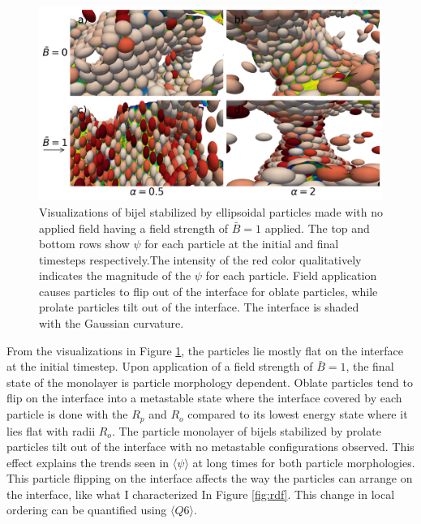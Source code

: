 \begin{figure} 
    \centering 
    \includegraphics[scale=0.4]{../figures/results/paper2/psi_concat_startB-0_endB-1.png} 
    \caption{Visualizations of bijel stabilized by ellipsoidal particles made with no applied field having a field strength of $\bar{B} = 1$ applied. The top and bottom 
             rows show $\psi$ for each particle at the initial and final timesteps respectively.The intensity
             of the red color qualitatively indicates the magnitude of the $\psi$ for each particle. Field application causes particles to flip out of the interface for
             oblate particles, while prolate particles tilt out of the interface. The interface is shaded with the Gaussian curvature.} 
    \label{fig:psi_field_on_visualize} 
\end{figure}

From the visualizations in Figure \ref{fig:psi_field_on_visualize}, the particles lie mostly flat on the interface at the initial timestep. Upon application of a field 
strength of $\bar{B} = 1$, the final state of the monolayer is particle morphology dependent. Oblate particles tend to flip on the interface into a metastable state where
the interface covered by each particle is done with the $R_p$ and $R_o$ compared to its lowest energy state where it lies flat with radii $R_o$. The particle monolayer
of bijels stabilized by prolate particles tilt out of the interface with no metastable configurations observed. This effect explains the trends seen in $\langle \psi \rangle$
at long times for both particle morphologies. This particle flipping on the interface affects the way the particles can arrange on the interface, like what I 
characterized In Figure \ref{fig:rdf}. This change in local ordering can be quantified using $\langle Q6 \rangle$.

